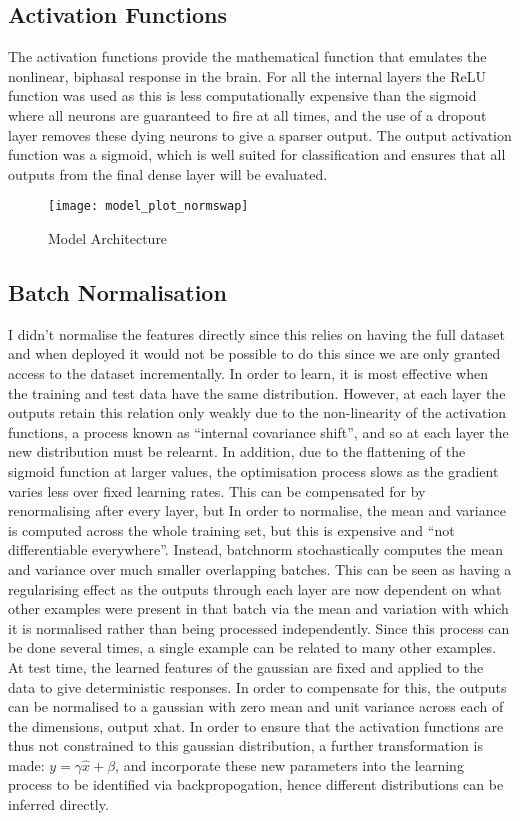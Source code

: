 \subsection{Activation Functions}
The activation functions provide the mathematical function that emulates the nonlinear, biphasal response in the brain. For all the internal layers the ReLU function was used as this is less computationally expensive than the sigmoid where all neurons are guaranteed to fire at all times, and the use of a dropout layer removes these dying neurons to give a sparser output. 
The output activation function was a sigmoid, which is well suited for classification and ensures that all outputs from the final dense layer will be evaluated.

\begin{figure}[h]
	\centering
	\texttt{[image: model\_plot\_normswap]}
	\caption{Model Architecture}
	\label{architecture}
\end{figure}

\subsection{Batch Normalisation}
I didn’t normalise the features directly since this relies on having the full dataset and when deployed it would not be possible to do this since we are only granted access to the dataset incrementally.
In order to learn, it is most effective when the training and test data have the same distribution. However, at each layer the outputs retain this relation only weakly due to the non-linearity of the activation functions, a process known as “internal covariance shift”, and so at each layer the new distribution must be relearnt. In addition, due to the flattening of the sigmoid function at larger values, the optimisation process slows as the gradient varies less over fixed learning rates. This can be compensated for by renormalising after every layer, but In order to normalise, the mean and variance is computed across the whole training set, but this is expensive and “not differentiable everywhere”. Instead, batchnorm stochastically computes the mean and variance over much smaller overlapping batches. This can be seen as having a regularising effect as the outputs through each layer are now dependent on what other examples were present in that batch via the mean and variation with which it is normalised rather than being processed independently. Since this process can be done several times, a single example can be related to many other examples. At test time, the learned features of the gaussian are fixed and applied to the data to give deterministic responses.
In order to compensate for this, the outputs can be normalised to a gaussian with zero mean and unit variance across each of the dimensions, output xhat. In order to ensure that the activation functions are thus not constrained to this gaussian distribution, a further transformation is made: $y = \gamma  \hat{x} + \beta$, and incorporate these new parameters into the learning process to be identified via backpropogation, hence different distributions can be inferred directly.

